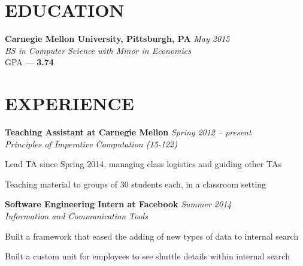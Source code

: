 \documentclass[margin, 11pt]{res} %
\begin{document}
\begin{resume}


\section{EDUCATION}

{\bf Carnegie Mellon University, Pittsburgh, PA} \hfill {\sl May 2015}\\
{\sl BS in Computer Science with Minor in Economics } \\
{\small GPA --- \textbf{3.74}}



\section{EXPERIENCE}

{\bf Teaching Assistant at Carnegie Mellon} \hfill {\sl Spring 2012 -- present}\\
{\sl Principles of Imperative Computation (15-122)}

\begin{itemize} \itemsep -2pt
{\small \item Lead TA since Spring 2014, managing class logistics and guiding other TAs
\item Teaching material to groups of 30 students each, in a classroom setting}
\end{itemize}

\vspace{3pt}

{\bf Software Engineering Intern at Facebook} \hfill {\sl Summer 2014}\\
{\sl Information and Communication Tools}

\begin{itemize} \itemsep -2pt
{\small
\item Built a framework that eased the adding of new types of data to internal search
\item Built a custom unit for employees to see shuttle details within internal search
}
\end{itemize}


\end{resume}
\end{document}

